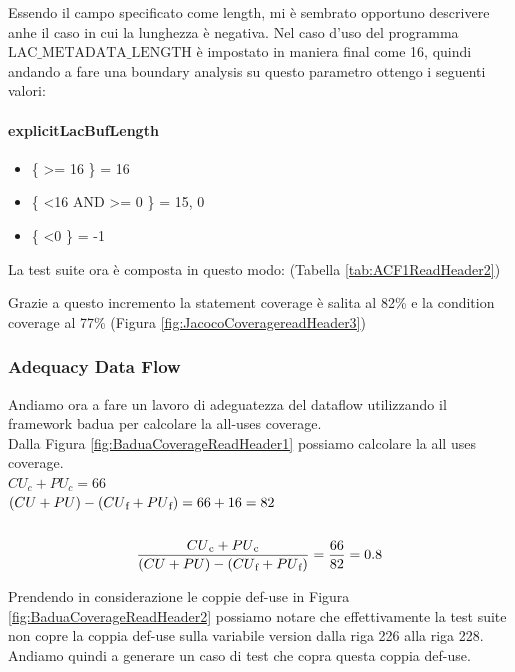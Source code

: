 \documentclass[12pt, a4paper]{article}
\begin{document}
Essendo il campo specificato come length, mi è sembrato opportuno descrivere anhe il caso in cui la lunghezza è negativa.
Nel caso d'uso del programma $\text{LAC\_METADATA\_LENGTH}$ è impostato in maniera final come 16, quindi andando a fare una boundary
analysis su questo parametro ottengo i seguenti valori:

\paragraph{explicitLacBufLength}
\begin{itemize}
  \item \{ \textgreater= 16 \} = 16
  \item \{ \textless 16 AND \textgreater= 0 \} = 15, 0
  \item \{ \textless 0 \} = -1
\end{itemize}

La test suite ora è composta in questo modo: (Tabella \ref{tab:ACF1ReadHeader2})

Grazie a questo incremento la statement coverage è salita al 82\%
e la condition coverage al 77\% (Figura \ref{fig:JacocoCoveragereadHeader3})


\subsubsection{Adequacy Data Flow}

Andiamo ora a fare un lavoro di adeguatezza del dataflow utilizzando il framework badua per calcolare la all-uses coverage. \\
Dalla Figura \ref{fig:BaduaCoverageReadHeader1} possiamo calcolare la all uses coverage. \\

\(CU_c + PU_c = 66\) \\
\( (CU + PU) - (CU\textsubscript{f} + PU\textsubscript{f}) = 66 + 16 = 82\) \\ \\
\[\frac{{CU\textsubscript{c} + PU\textsubscript{c}}}{{(CU + PU) - (CU\textsubscript{f} + PU\textsubscript{f})}} = \frac{{66}}{{82}} = 0.8\]

Prendendo in considerazione le coppie def-use in Figura \ref{fig:BaduaCoverageReadHeader2} possiamo notare che
effettivamente la test suite non copre la coppia def-use sulla variabile version dalla riga 226 alla riga 228.
Andiamo quindi a generare un caso di test che copra questa coppia def-use. \\
\end{document}
